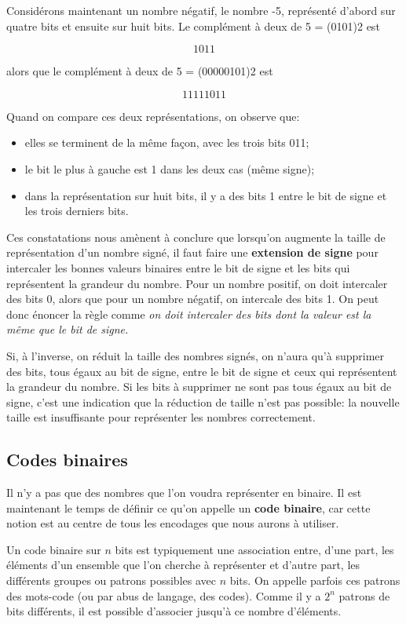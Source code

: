 \documentclass[11pt]{article}
\begin{document}
Considérons maintenant un nombre négatif, le nombre -5, représenté
d'abord sur quatre bits et ensuite sur huit bits. Le complément à deux
de 5 = (0101)2 est

$$ 1011 $$

alors que le complément à deux de 5 = (00000101)2 est

$$ 11111011 $$

Quand on compare ces deux représentations, on observe que: 

\begin{itemize}
\item elles se terminent de la même façon, avec les trois bits 011;
\item le bit le plus à gauche est 1 dans les deux cas (même signe);
\item dans la représentation sur huit bits, il y a des bits 1 entre le bit
de signe et les trois derniers bits.
\end{itemize}

Ces constatations nous amènent à conclure que lorsqu'on augmente la
taille de représentation d'un nombre signé, il faut faire une
\textbf{extension de signe} pour intercaler les bonnes valeurs binaires entre
le bit de signe et les bits qui représentent la grandeur du
nombre. Pour un nombre positif, on doit intercaler des bits 0, alors
que pour un nombre négatif, on intercale des bits 1. On peut donc
énoncer la règle comme \emph{on doit intercaler des bits dont la valeur est
la même que le bit de signe.}

Si, à l'inverse, on réduit la taille des nombres signés, on n'aura
qu'à supprimer des bits, tous égaux au bit de signe, entre le bit de
signe et ceux qui représentent la grandeur du nombre. Si les bits à
supprimer ne sont pas tous égaux au bit de signe, c'est une indication
que la réduction de taille n'est pas possible: la nouvelle taille est
insuffisante pour représenter les nombres correctement.


\subsection{Codes binaires}
\label{sec:org7d267ef}

Il n'y a pas que des nombres que l'on voudra représenter en
binaire. Il est maintenant le temps de définir ce qu'on appelle un
\textbf{code binaire}, car cette notion est au centre de tous les encodages
que nous aurons à utiliser.

Un code binaire sur \(n\) bits est typiquement une association entre,
d'une part, les éléments d'un ensemble que l'on cherche à représenter
et d’autre part, les différents groupes ou patrons possibles avec
\(n\) bits. On appelle parfois ces patrons des mots-code (ou par abus
de langage, des codes). Comme il y a \(2^n\) patrons de bits
différents, il est possible d'associer jusqu'à ce nombre
d'éléments.
\end{document}
